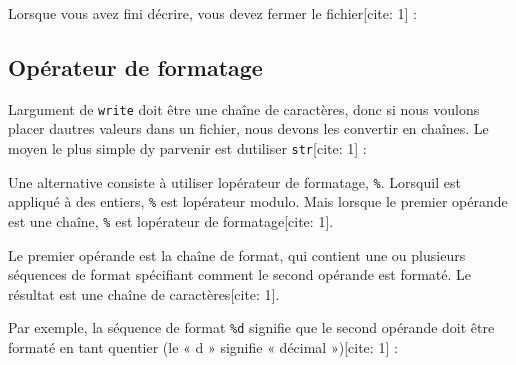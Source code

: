 Lorsque vous avez fini d\textquotesingle écrire, vous devez fermer le
fichier{[}cite: 1{]} :

\begin{Shaded}
\begin{Highlighting}[]
\OperatorTok{\textgreater{}\textgreater{}\textgreater{}}
\end{Highlighting}
\end{Shaded}

\hypertarget{opuxe9rateur-de-formatage}{%
\subsection{Opérateur de formatage}\label{opuxe9rateur-de-formatage}}

L\textquotesingle argument de \texttt{write} doit être une chaîne de
caractères, donc si nous voulons placer d\textquotesingle autres valeurs
dans un fichier, nous devons les convertir en chaînes. Le moyen le plus
simple d\textquotesingle y parvenir est d\textquotesingle utiliser
\texttt{str}{[}cite: 1{]} :

\begin{Shaded}
\begin{Highlighting}[]
\OperatorTok{\textgreater{}\textgreater{}\textgreater{}}\OperatorTok{=} 
\OperatorTok{\textgreater{}\textgreater{}\textgreater{}}
\end{Highlighting}
\end{Shaded}

Une alternative consiste à utiliser l\textquotesingle opérateur de
formatage, \texttt{\%}. Lorsqu\textquotesingle il est appliqué à des
entiers, \texttt{\%} est l\textquotesingle opérateur modulo. Mais
lorsque le premier opérande est une chaîne, \texttt{\%} est
l\textquotesingle opérateur de formatage{[}cite: 1{]}.

Le premier opérande est la chaîne de format, qui contient une ou
plusieurs séquences de format spécifiant comment le second opérande est
formaté. Le résultat est une chaîne de caractères{[}cite: 1{]}.

Par exemple, la séquence de format
\texttt{\textquotesingle{}\%d\textquotesingle{}} signifie que le second
opérande doit être formaté en tant qu\textquotesingle entier (le « d »
signifie « décimal »){[}cite: 1{]} :

\begin{Shaded}
\begin{Highlighting}[]
\OperatorTok{\textgreater{}\textgreater{}\textgreater{}}\OperatorTok{=} 
\OperatorTok{\textgreater{}\textgreater{}\textgreater{}} \StringTok{\textquotesingle{}}\StringTok{\textquotesingle{}} \OperatorTok{\%}
\CommentTok{\textquotesingle{}42\textquotesingle{}}
\end{Highlighting}
\end{Shaded}

